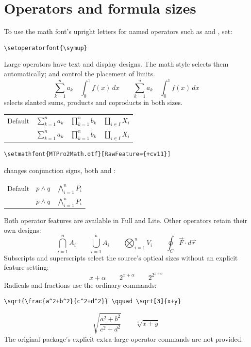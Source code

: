 \documentclass[11pt,a4paper]{article}
\newcommand{\code}[1]{\texttt{\detokenize{#1}}}
\newcommand{\sample}[2]{\begingroup\mathversion{#1}$#2$\endgroup}
\newcommand{\operatorsample}{\displaystyle
  \sum_{k=1}^{n}a_k\quad\prod_{k=1}^{n}b_k\quad\coprod_{i\in I}X_i}
\newcommand{\andsample}{p\wedge q\quad\displaystyle\bigwedge_{i=1}^{n}P_i}
\begin{document}
\section{Operators and formula sizes}
To use the math font's upright letters for named operators such as
\code{\sin} and \code{\cos}, set:
\begin{verbatim}
\setoperatorfont{\symup}
\end{verbatim}
Large operators have text and display designs. The math style selects
them automatically; \code{\limits} and \code{\nolimits} control the
placement of limits.
\[
  \textstyle\sum_{k=1}^{n}a_k\quad\int_0^1 f(x)\,dx
  \qquad\displaystyle\sum_{k=1}^{n}a_k\quad\int_0^1 f(x)\,dx
\]
\code{cv11} selects slanted sums, products and coproducts in both sizes.
\begin{center}
\begin{tabular}{@{}ll@{}}
Default & \sample{normal}{\operatorsample}\\[9pt]
\code{cv11} & \sample{slantedops}{\operatorsample}\\
\end{tabular}
\end{center}
\begin{verbatim}
\setmathfont{MTPro2Math.otf}[RawFeature={+cv11}]
\end{verbatim}
\code{cv12} changes conjunction signs, both \code{\wedge} and
\code{\bigwedge}:
\begin{center}
\begin{tabular}{@{}ll@{}}
Default & \sample{normal}{\andsample}\\[9pt]
\code{cv12} & \sample{andalt}{\andsample}\\
\end{tabular}
\end{center}
Both operator features are available in Full and Lite.
Other operators retain their own designs:
\[
  \bigcap_{i=1}^{n}A_i\qquad\bigcup_{i=1}^{n}A_i
  \qquad\bigotimes_{i=1}^{n}V_i\qquad\oint_C\vec{F}\cdot d\vec{r}
\]
Subscripts and superscripts select the source's optical sizes without
an explicit feature setting:
\[
  x+\alpha\qquad 2^{x+\alpha}\qquad 2^{2^{x+\alpha}}
\]
Radicals and fractions use the ordinary commands:
\begin{verbatim}
\sqrt{\frac{a^2+b^2}{c^2+d^2}} \qquad \sqrt[3]{x+y}
\end{verbatim}
\[
  \sqrt{\frac{a^2+b^2}{c^2+d^2}}\qquad\sqrt[3]{x+y}
\]
The original package's explicit extra-large operator commands are not
provided.
\end{document}
